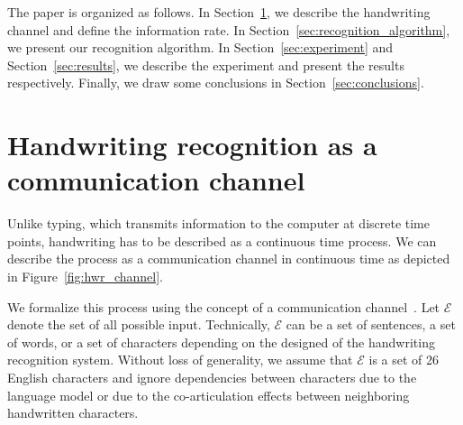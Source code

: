 \documentclass{sigchi}
\begin{document}

The paper is organized as follows. In Section~\ref{sec:channel}, we
describe the handwriting channel and define the information rate. In
Section~\ref{sec:recognition_algorithm}, we present our recognition
algorithm. In Section~\ref{sec:experiment} and
Section~\ref{sec:results}, we describe the experiment and present the
results respectively. Finally, we draw some conclusions in
Section~\ref{sec:conclusions}.

\section{Handwriting recognition as a communication channel}
\label{sec:channel}

Unlike typing, which transmits information to the computer at discrete
time points, handwriting has to be described as a continuous time
process. We can describe the process as a communication channel in
continuous time as depicted in Figure~\ref{fig:hwr_channel}.

\newcommand{\intent}{M}
\newcommand{\intentSet}{\mathcal{E}}
\newcommand{\intentDist}{\mathcal{M}}
\newcommand{\pred}[1]{\mathcal{Q}_{#1}}
\newcommand{\predFinal}{\pred{final}}
\newcommand{\writing}[1]{W_{1:{#1}}}
\newcommand{\writingDist}{P(\bar{W} | \intent)}
\newcommand{\tFinal}{T}
\newcommand{\MI}{I(\intent ; \predFinal)}
\newcommand{\EMI}{\hat{I}(\intent ; \predFinal)}
\newcommand{\session}{\mathcal{S}}
\newcommand{\bps}{R}
\newcommand{\logloss}{\mathcal{L}}
\newcommand{\expectedDuration}{\mathbb{E} \left[\tFinal\right]}

We formalize this process using the concept of a communication
channel~\cite{Shannon1948}.  Let $\intentSet$ denote the set of all
possible input. Technically, $\intentSet$ can be a set of sentences, a
set of words, or a set of characters depending on the designed of the
handwriting recognition system. Without loss of generality, we assume
that $\intentSet$ is a set of 26 English characters and ignore
dependencies between characters due to the language model or due to
the co-articulation effects between neighboring handwritten
characters.
\end{document}
